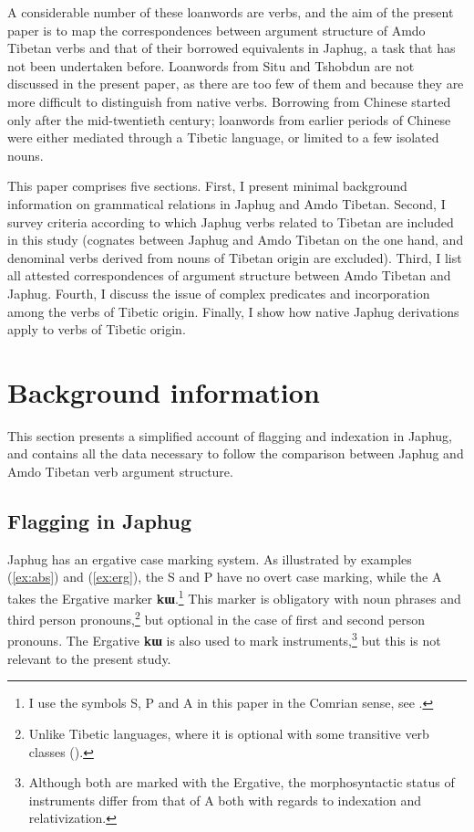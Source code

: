 \documentclass[oneside,a4paper,11pt]{article}
\newcommand{\ipa}[1]{{\phon\textbf{\mbox{#1}}}} %
\newcommand{\refb}[1]{(\ref{#1})}
\begin{document}
A considerable number of these loanwords are verbs, and the aim of the present paper is to map the correspondences between argument structure of Amdo Tibetan verbs and that of their borrowed equivalents in Japhug, a task that has not been undertaken before. Loanwords from Situ and Tshobdun are not discussed in the present paper, as there are too few of them and because they are more difficult to distinguish from native verbs. Borrowing from Chinese started only after the mid-twentieth century; loanwords from earlier periods of Chinese were either mediated through a Tibetic language, or limited to a few isolated nouns.

This paper comprises five sections. First, I present minimal background information on grammatical relations in Japhug and Amdo Tibetan. Second, I survey criteria according to which Japhug verbs related to Tibetan are included in this study (cognates between Japhug and Amdo Tibetan on the one hand, and denominal verbs derived from nouns of Tibetan origin are excluded). Third, I list all attested correspondences of argument structure between Amdo Tibetan and Japhug. Fourth, I discuss the issue of complex predicates and incorporation among the verbs of Tibetic origin. Finally, I show how native Japhug derivations apply to verbs of Tibetic origin.

\section{Background information}
This section presents a simplified account of flagging and indexation in Japhug, and contains all the data necessary to follow the comparison between Japhug and Amdo Tibetan verb argument structure.

\subsection{Flagging in Japhug}
Japhug has an ergative case marking system. As illustrated by examples \refb{ex:abs} and \refb{ex:erg}, the S and P have no overt case marking, while the A takes the Ergative marker \ipa{kɯ}.\footnote{I use the symbols S, P and A in this paper in the Comrian sense, see \citet{haspelmath11SAPTR}.} This marker is obligatory with noun phrases and third person pronouns,\footnote{Unlike Tibetic languages, where it is optional with some transitive verb classes (\citealt{tournadre91}).} but optional in the case of first and second person pronouns.  The Ergative \ipa{kɯ} is also used to mark instruments,\footnote{Although both are marked with the Ergative, the morphosyntactic status of instruments differ from that of A both with regards to indexation and relativization.} but this is not relevant to the present study.
\end{document}
